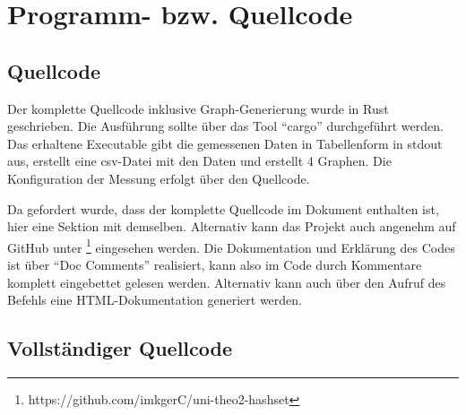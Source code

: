 \chapter{Programm- bzw. Quellcode}
\section{Quellcode}
Der komplette Quellcode inklusive Graph-Generierung wurde in Rust geschrieben. Die Ausführung sollte über das Tool \enquote{cargo} durchgeführt werden. Das erhaltene Executable gibt die gemessenen Daten in Tabellenform in stdout aus, erstellt eine csv-Datei mit den Daten und erstellt 4 Graphen. Die Konfiguration der Messung erfolgt über den Quellcode.

Da gefordert wurde, dass der komplette Quellcode im Dokument enthalten ist, hier eine Sektion mit demselben. Alternativ kann das Projekt auch angenehm auf GitHub unter \footnote{https://github.com/imkgerC/uni-theo2-hashset} eingesehen werden. Die Dokumentation und Erklärung des Codes ist über \enquote{Doc Comments} realisiert, kann also im Code durch Kommentare komplett eingebettet gelesen werden. Alternativ kann auch über den Aufruf des Befehls  eine HTML-Dokumentation generiert werden.
\section{Vollständiger Quellcode}




